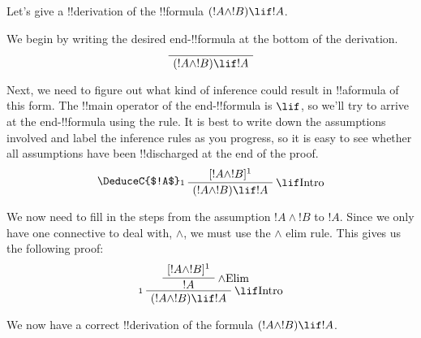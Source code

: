 \documentclass[../../../include/open-logic-section]{subfiles}
\begin{document}


\begin{ex}
Let's give a !!{derivation} of the !!{formula} $(!A \land !B) \lif !A$.

We begin by writing the desired end-!!{formula} at the bottom of the derivation.
\[
\AxiomC{}
\UnaryInfC{$(!A\land !B) \lif !A$}
\DisplayProof
\]

Next, we need to figure out what kind of inference could result in
!!a{formula} of this form. The !!{main operator} of the
end-!!{formula} is $\lif$, so we'll try to arrive at the
end-!!{formula} using the \Intro{\lif} rule. It is best to write down
the assumptions involved and label the inference rules as you
progress, so it is easy to see whether all assumptions have been
!!{discharged} at the end of the proof.
\[
\AxiomC{$\Discharge{!A \land !B}{1}$}
\DeduceC{$!A$}
\DischargeRule{\Intro{\lif}}{1} 
\UnaryInfC{$(!A\land !B) \lif !A$}
\DisplayProof
\]

We now need to fill in the steps from the assumption $!A \land !B$ to $!A$.
Since we only have one connective to deal with, $\land$, we must
use the $\land$ elim rule. This gives us the following proof:
\[
\AxiomC{$\Discharge{!A \land !B}{1}$}
\RightLabel{\Elim{\land}}
\UnaryInfC{$!A$}
\DischargeRule{\Intro{\lif}}{1} 
\UnaryInfC{$(!A\land !B) \lif !A$}
\DisplayProof
\]

We now have a correct !!{derivation} of the formula $(!A \land
!B) \lif !A$.
\end{ex}
\end{document}
